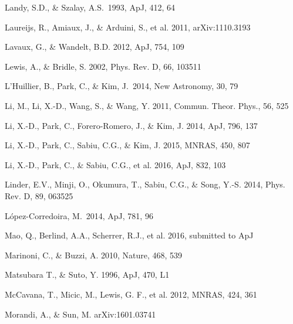 \documentclass[prl,twocolumn,superscriptaddress,aps,amsmath,amssymb,nofootinbib,altaffilletter]{revtex4}
\begin{document}
\begin{thebibliography}{}
Landy, S.D., \& Szalay, A.S.\ 1993, ApJ, 412, 64 

Laureijs, R., Amiaux, J., \& Arduini, S., et al. 2011, arXiv:1110.3193

Lavaux, G., \& Wandelt, B.D. 2012, ApJ, 754, 109  


Lewis, A., \& Bridle, S. 2002, Phys. Rev. D, 66, 103511

L'Huillier, B., Park, C., \& Kim, J.\ 2014, New Astronomy, 30, 79 

Li, M., Li, X.-D., Wang, S., \& Wang, Y. 2011, Commun. Theor. Phys., 56, 525

Li, X.-D., Park, C., Forero-Romero, J., \& Kim, J. 2014, ApJ, 796, 137

Li, X.-D., Park, C., Sabiu, C.G., \& Kim, J. 2015, MNRAS, 450, 807 

Li, X.-D., Park, C., \& Sabiu, C.G., et al. 2016, ApJ, 832, 103


Linder, E.V., Minji, O., Okumura, T., Sabiu, C.G., \& Song, Y.-S. 2014, Phys. Rev. D, 89, 063525  

L{\'o}pez-Corredoira, M.\ 2014, ApJ, 781, 96 

Mao, Q., Berlind, A.A., Scherrer, R.J., et al. 2016, submitted to ApJ

Marinoni, C., \& Buzzi, A. 2010, Nature, 468, 539  

Matsubara T., \& Suto, Y. 1996, ApJ, 470, L1  

McCavana, T., Micic, M., Lewis, G. F., et al. 2012, MNRAS, 424, 361


Morandi, A., \& Sun, M. arXiv:1601.03741



\end{thebibliography}
\end{document}
